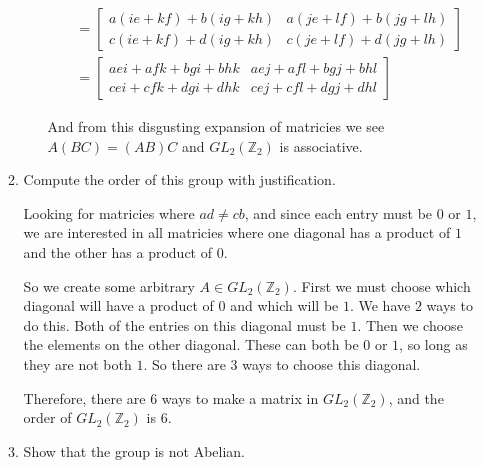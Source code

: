 \documentclass{article}
\begin{document}
\begin{enumerate}
\begin{enumerate}[label= (\alph*)]
\begin{enumerate}[label=(\roman*)]
\begin{align*}
                                &= \begin{bmatrix} a(ie+kf)+b(ig+kh)&a(je+lf)+b(jg+lh)\\
                                c(ie+kf)+d(ig+kh)&c(je+lf)+d(jg+lh)\end{bmatrix}\\
                                &= \begin{bmatrix} aei+afk+bgi+bhk&aej+afl+bgj+bhl\\
                                cei+cfk+dgi+dhk& cej+cfl+dgj+dhl\end{bmatrix} 
                        \end{align*}

                        And from this disgusting expansion of matricies we see $A(BC)=(AB)C$ and 
                        $GL_2(\mathbb{Z}_2)$ is associative.
            \end{enumerate}
        \item Compute the order of this group with justification.

            Looking for matricies where $ad\neq c b$, and since each entry must be $0 $ or $1$,
            we are interested in all matricies where one diagonal has a product of $1$ and the other
            has a product of $0$.

            So we create some arbitrary $A\in GL_2(\mathbb{Z}_2)$. First we must choose which diagonal
            will have a product of  $0$ and which will be $1$. We have $2$ ways to do this.
            Both of the entries on this diagonal must be $1$. Then we choose the elements on the other
            diagonal. These can both be $0$ or $1$, so long as they are not both $1$. So there are $3$
            ways to choose this diagonal.

            Therefore, there are $6$ ways to make a matrix in $GL_2(\mathbb{Z}_2)$, and the order of
            $GL_2(\mathbb{Z}_2)$ is $6$.
        \item Show that the group is not Abelian.


\end{enumerate}
\end{enumerate}
\end{document}
